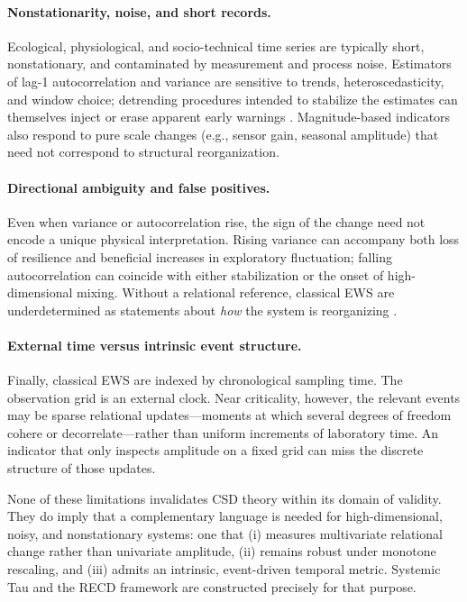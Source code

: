 \documentclass[11pt,a4paper]{article}
\begin{document}
\paragraph{Nonstationarity, noise, and short records.}
Ecological, physiological, and socio-technical time series are typically
short, nonstationary, and contaminated by measurement and process noise.
Estimators of lag-1 autocorrelation and variance are sensitive to trends,
heteroscedasticity, and window choice; detrending procedures intended to
stabilize the estimates can themselves inject or erase apparent early
warnings \cite{Dakos2012,Boettiger2013}. Magnitude-based indicators also
respond to pure scale changes (e.g., sensor gain, seasonal amplitude)
that need not correspond to structural reorganization.

\paragraph{Directional ambiguity and false positives.}
Even when variance or autocorrelation rise, the sign of the change need
not encode a unique physical interpretation. Rising variance can
accompany both loss of resilience and beneficial increases in exploratory
fluctuation; falling autocorrelation can coincide with either
stabilization or the onset of high-dimensional mixing. Without a
relational reference, classical EWS are underdetermined as statements
about \emph{how} the system is reorganizing
\cite{Boettiger2013,Dakos2015}.

\paragraph{External time versus intrinsic event structure.}
Finally, classical EWS are indexed by chronological sampling time. The
observation grid is an external clock. Near criticality, however, the
relevant events may be sparse relational updates---moments at which
several degrees of freedom cohere or decorrelate---rather than uniform
increments of laboratory time. An indicator that only inspects amplitude
on a fixed grid can miss the discrete structure of those updates.

None of these limitations invalidates CSD theory within its domain of
validity. They do imply that a complementary language is needed for
high-dimensional, noisy, and nonstationary systems: one that (i) measures
multivariate relational change rather than univariate amplitude,
(ii) remains robust under monotone rescaling, and (iii) admits an
intrinsic, event-driven temporal metric. Systemic Tau and the RECD
framework are constructed precisely for that purpose.
\end{document}
